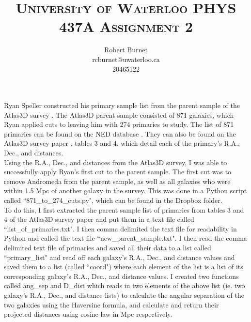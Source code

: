 \documentclass[10pt,letterpaper]{article}
\begin{document}
\title{\scshape\LARGE University of Waterloo \vfill \huge\bfseries PHYS 437A Assignment 2 \vfill}
\author{Robert Burnet \\ rcburnet@uwaterloo.ca \\ 20465122 }
\maketitle

\newpage

Ryan Speller constructed his primary sample list from the parent sample of the Atlas3D survey \cite{Atlas3D}. The Atlas3D parent sample consisted of 871 galaxies, which Ryan applied cuts to leaving him with 274 primaries to study. The list of 871 primaries can be found on the NED database \cite{NED 871}.  They can also be found on the Atlas3D survey paper \cite{Atlas3D}, tables 3 and 4, which detail each of the primary's R.A., Dec., and distances.\\

Using the R.A., Dec., and distances from the Atlas3D survey, I was able to successfully apply Ryan's first cut to the parent sample. The first cut was to remove Andromeda from the parent sample, as well as all galaxies who were within 1.5 Mpc of another galaxy in the survey. This was done in a Python script called ``871\_to\_274\_cuts.py", which can be found in the Dropbox folder.\\

To do this, I first extracted the parent sample list of primaries from tables 3 and 4 of the Atlas3D survey paper and put them in a text file called ``list\_of\_primaries.txt". I then comma delimited the text file for readability in Python and called the text file ``new\_parent\_sample.txt". I then read the comma delimited text file of primaries and saved all their data to a list called ``primary\_list" and read off each galaxy's R.A., Dec., and distance values and saved them to a list (called ``coord") where each element of the list is a list of its corresponding galaxy's R.A., Dec., and distance values. I created two functions called ang\_sep and D\_dist which reads in two elements of the above list (ie. two galaxy's R.A., Dec., and distance lists) to calculate the angular separation of the two galaxies using the Haversine formula, and calculate and return their projected distances using cosine law in Mpc respectively.\\
\end{document}
